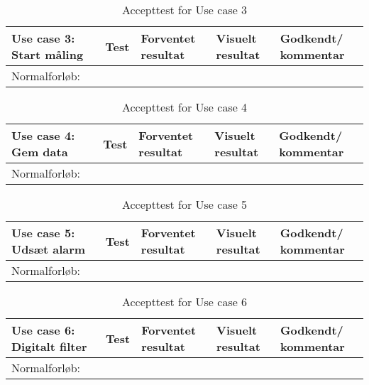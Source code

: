 \begin{table}[h!]
\caption{Accepttest for Use case 3}\label{tab:tabel8}
\begin{tabular}{|>{\raggedright\arraybackslash}p{2.5cm}| >{\raggedright\arraybackslash}p{2.9cm} | >{\raggedright\arraybackslash}p{2.9cm} | >{\raggedright\arraybackslash}p{2.9cm} | >{\raggedright\arraybackslash}p{2.8cm} |}
   \hline
   \textbf{Use case 3: Start måling } &\textbf{Test}& \textbf{Forventet resultat} & \textbf{Visuelt resultat} & \textbf{Godkendt/ kommentar}\\ \hline
   Normalforløb:& & & &\\\hline
\end{tabular}
\end{table}

\begin{table}[h!]
\caption{Accepttest for Use case 4}\label{tab:tabel8}
\begin{tabular}{|>{\raggedright\arraybackslash}p{2.5cm}| >{\raggedright\arraybackslash}p{2.9cm} | >{\raggedright\arraybackslash}p{2.9cm} | >{\raggedright\arraybackslash}p{2.9cm} | >{\raggedright\arraybackslash}p{2.8cm} |}
   \hline
   \textbf{Use case 4: Gem data } &\textbf{Test}& \textbf{Forventet resultat} & \textbf{Visuelt resultat} & \textbf{Godkendt/ kommentar}\\ \hline
   Normalforløb:& & & &\\\hline
\end{tabular}
\end{table}


\begin{table}[h!]
\caption{Accepttest for Use case 5}\label{tab:tabel8}
\begin{tabular}{|>{\raggedright\arraybackslash}p{2.5cm}| >{\raggedright\arraybackslash}p{2.9cm} | >{\raggedright\arraybackslash}p{2.9cm} | >{\raggedright\arraybackslash}p{2.9cm} | >{\raggedright\arraybackslash}p{2.8cm} |}
   \hline
   \textbf{Use case 5: Udsæt alarm } &\textbf{Test}& \textbf{Forventet resultat} & \textbf{Visuelt resultat} & \textbf{Godkendt/ kommentar}\\ \hline
   Normalforløb:& & & &\\\hline
\end{tabular}
\end{table}



\begin{table}[h!]
\caption{Accepttest for Use case 6}\label{tab:tabel8}
\begin{tabular}{|>{\raggedright\arraybackslash}p{2.5cm}| >{\raggedright\arraybackslash}p{2.9cm} | >{\raggedright\arraybackslash}p{2.9cm} | >{\raggedright\arraybackslash}p{2.9cm} | >{\raggedright\arraybackslash}p{2.8cm} |}
   \hline
   \textbf{Use case 6: Digitalt filter } &\textbf{Test}& \textbf{Forventet resultat} & \textbf{Visuelt resultat} & \textbf{Godkendt/ kommentar}\\ \hline
   Normalforløb:& & & &\\\hline
\end{tabular}
\end{table}


